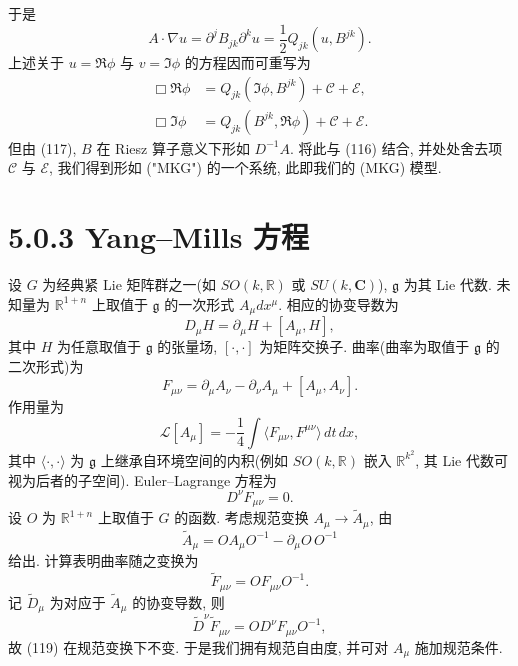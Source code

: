 于是
\begin{equation}
A\cdot\nabla u=\partial^j B_{jk}\partial^k u=\frac12 Q_{jk}(u,B^{jk}).\end{equation}
上述关于 $u=\Re\phi$ 与 $v=\Im\phi$ 的方程因而可重写为
\begin{equation}
\begin{aligned}
\Box\Re\phi&=Q_{jk}(\Im\phi,B^{jk})+\mathcal{C}+\mathcal{E},\\
\Box\Im\phi&=Q_{jk}(B^{jk},\Re\phi)+\mathcal{C}+\mathcal{E}.\end{aligned}
\end{equation}
但由 (117), $B$ 在 Riesz 算子意义下形如 $D^{-1}A$. 将此与 (116) 结合, 并处处舍去项 $\mathcal{C}$ 与 $\mathcal{E}$, 我们得到形如 ("MKG") 的一个系统, 此即我们的 (MKG) 模型.
\section*{5.0.3 Yang--Mills 方程}

设 $G$ 为经典紧 Lie 矩阵群之一(如 $SO(k,\mathbb{R})$ 或 $SU(k,\mathbf{C})$), $\mathfrak{g}$ 为其 Lie 代数. 未知量为 $\mathbb{R}^{1+n}$ 上取值于 $\mathfrak{g}$ 的一次形式 $A_\mu dx^\mu$. 相应的协变导数为
\begin{equation}
D_\mu H=\partial_\mu H+[A_\mu,H],\end{equation}
其中 $H$ 为任意取值于 $\mathfrak{g}$ 的张量场, $[\cdot,\cdot]$ 为矩阵交换子. 曲率(曲率为取值于 $\mathfrak{g}$ 的二次形式)为
\begin{equation}
F_{\mu\nu}=\partial_\mu A_\nu-\partial_\nu A_\mu+[A_\mu,A_\nu].\end{equation}
作用量为
\begin{equation}
\mathcal{L}[A_\mu]=-\frac14\int\langle F_{\mu\nu},F^{\mu\nu}\rangle\,dt\,dx,\end{equation}
其中 $\langle\cdot,\cdot\rangle$ 为 $\mathfrak{g}$ 上继承自环境空间的内积(例如 $SO(k,\mathbb{R})$ 嵌入 $\mathbb{R}^{k^2}$, 其 Lie 代数可视为后者的子空间). Euler--Lagrange 方程为
\begin{equation}
D^\nu F_{\mu\nu}=0.\end{equation}
设 $O$ 为 $\mathbb{R}^{1+n}$ 上取值于 $G$ 的函数. 考虑规范变换 $A_\mu\to\widetilde A_\mu$, 由
\begin{equation}
\widetilde A_\mu=O A_\mu O^{-1}-\partial_\mu O\,O^{-1}
\end{equation}
给出. 计算表明曲率随之变换为
\begin{equation}
\widetilde F_{\mu\nu}=O F_{\mu\nu}O^{-1}.\end{equation}
记 $\widetilde D_\mu$ 为对应于 $\widetilde A_\mu$ 的协变导数, 则
\begin{equation}
\widetilde D^\nu\widetilde F_{\mu\nu}=O D^\nu F_{\mu\nu}O^{-1},\end{equation}
故 (119) 在规范变换下不变. 于是我们拥有规范自由度, 并可对 $A_\mu$ 施加规范条件.
